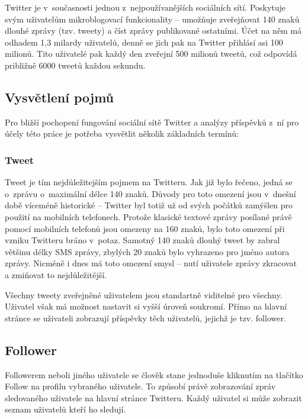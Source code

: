 \documentclass[thesis=B,czech]{FITthesis}[2012/06/26]
\begin{document}
	Twitter je v~současnosti jednou z~nejpoužívanějších sociálních sítí. Poskytuje svým uživatelům mikroblogovací funkcionality -- umožňuje zveřejňovat 140 znaků dlouhé zprávy (tzv. tweety) a číst zprávy publikované ostatními. Účet na něm má odhadem 1,3 milardy uživatelů, denně se jich pak na Twitter přihlásí asi 100 milionů\cite{twitter-stats}. Tito uživatelé pak každý den zveřejní 500 milionů tweetů, což odpovídá približně 6000 tweetů každou sekundu\cite{twitter-stats-2}. 

\subsection{Vysvětlení pojmů}
Pro bližší pochopení fungování sociální sítě Twitter a analýzy příspěvků z~ní pro účely této práce je potřeba vysvětlit několik základních termínů:

\subsubsection{Tweet}

Tweet je tím nejdůležitejším pojmem na Twitteru. Jak již bylo řečeno, jedná se o~zprávu o~maximální délce 140 znaků. Důvody pro toto omezení jsou v~dnešní době víceméně historické -- Twitter byl totiž už od svých počátků zamýšlen pro použití na mobilních telefonech. Protože klasické textové zprávy posílané právě pomocí mobilních telefonů jsou omezeny na 160 znaků, bylo toto omezení při vzniku Twitteru bráno v~potaz. Samotný 140 znaků dlouhý tweet by zabral většinu délky SMS zprávy, zbylých 20 znaků bylo vyhrazeno pro jméno autora zprávy\cite{twitter-140}. Nicméně i dnes má toto omezení smysl -- nutí uživatele zprávy zkracovat a zmiňovat to nejdůležitější. 

Všechny tweety zveřejněné uživatelem jsou standartně viditelné pro všechny. Uživatel však má možnost nastavit si vyšší úroveň soukromí. Přímo na hlavní stránce se uživateli zobrazují příspěvky těch uživatelů, jejichž je tzv. follower. 

\subsection{Follower}

	Followerem neboli  jiného uživatele se člověk stane jednoduše kliknutím na tlačítko Follow na profilu vybraného uživatele. To způsobí právě zobrazování zpráv sledovaného uživatele na hlavní stránce Twitteru. Každý uživatel si může zobrazit seznam uživatelů kteří ho sledují. 
\end{document}
